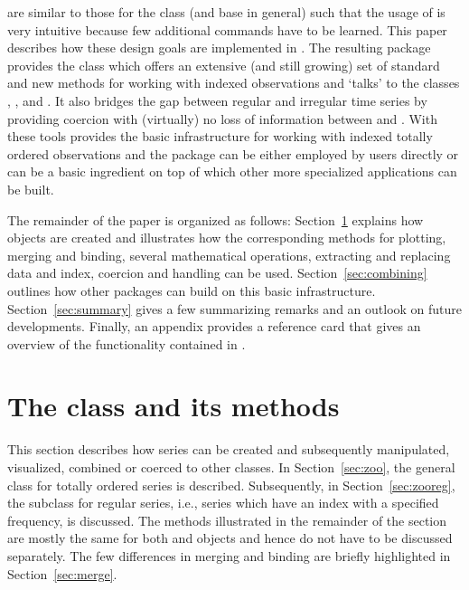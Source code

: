 \documentclass{Z}
\begin{document}
are similar to those for the  class (and base  in
general) such that the usage of  is very intuitive because
few additional commands have to be learned. 
This paper describes how these design goals are implemented in .
The resulting package provides the  class which offers an
extensive (and still growing) set of standard and new methods for working
with indexed observations and `talks' to the classes , ,
 and . It also bridges the gap
between regular and irregular time series by providing coercion with (virtually)
no loss of information between  and .
With these tools  provides the basic infrastructure for
working with indexed totally ordered observations and the package can be either employed by
users directly or can be a basic ingredient on top of which other more specialized
applications can be built.

The remainder of the paper is organized as follows:
Section~\ref{sec:zoo-class} explains how  objects are created
and illustrates how the corresponding methods for plotting, merging and
binding, several mathematical operations, extracting and replacing data
and index, coercion and  handling can be used. Section~\ref{sec:combining}
outlines how other packages can build on this basic infrastructure.
Section~\ref{sec:summary} gives a few summarizing remarks and an outlook
on future developments. Finally, an appendix provides a reference card that
gives an overview of the functionality contained in .


\section[The class "zoo" and its methods]{The class  and its methods}
\label{sec:zoo-class}

This section describes how  series can be created and subsequently
manipulated, visualized, combined or coerced to other classes. In Section~\ref{sec:zoo},
the general class  for totally ordered series is described. Subsequently,
in Section~\ref{sec:zooreg}, the subclass  for
regular  series, i.e., series which have an index with a specified
frequency, is discussed. The methods illustrated in the remainder of the
section are mostly the same for both  and  objects
and hence do not have to be discussed separately. The few differences in merging and
binding are briefly highlighted in Section~\ref{sec:merge}.
\end{document}
